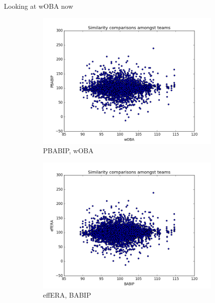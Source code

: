 \documentclass[12pt]{article}
\numberwithin{equation}{subsection}
\begin{document}
  
 Looking at wOBA now

\begin{figure}[H] 
  \begin{subfigure}[b]{0.5\linewidth}
    \centering
    \includegraphics[width=0.9\linewidth]{Sim11} 
    \caption{PBABIP, wOBA} 
    \label{fig5:a} 
    \vspace{4ex}
  \end{subfigure}%
  \begin{subfigure}[b]{0.5\linewidth}
    \centering
    \includegraphics[width=0.9\linewidth]{Sim12} 
    \caption{effERA, BABIP} 
    \label{fig5:b} 
    \vspace{4ex}
  \end{subfigure} 
  \begin{subfigure}[b]{0.5\linewidth}
    \centering

\end{subfigure}
\end{figure}
\end{document}
